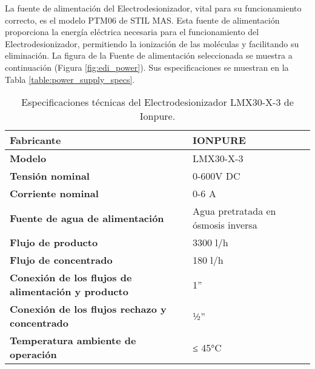 

La fuente de alimentación del Electrodesionizador, vital para su funcionamiento correcto, es el modelo PTM06 de STIL MAS. Esta fuente de alimentación proporciona la energía eléctrica necesaria para el funcionamiento del Electrodesionizador, permitiendo la ionización de las moléculas y facilitando su eliminación. La figura de la Fuente de alimentación seleccionada se muestra a continuación (Figura \ref{fig:edi_power}). Sus especificaciones se muestran en la Tabla \ref{table:power_supply_specs}.




\begin{table}[H]
    \centering
    \caption{Especificaciones técnicas del Electrodesionizador LMX30-X-3 de Ionpure.}
    \label{table:edi_specs}
    \begin{tabular}{| L{6cm} | L{6cm} |}
        \hline
        \textbf{Fabricante}                                        & IONPURE                            \\
        \hline
        \textbf{Modelo}                                            & LMX30-X-3                          \\
        \hline
        \textbf{Tensión nominal}                                   & 0-600V DC                          \\
        \hline
        \textbf{Corriente nominal}                                 & 0-6 A                              \\
        \hline
        \textbf{Fuente de agua de alimentación}                    & Agua pretratada en ósmosis inversa \\
        \hline
        \textbf{Flujo de producto}                                 & 3300 l/h                           \\
        \hline
        \textbf{Flujo de concentrado}                              & 180 l/h                            \\
        \hline
        \textbf{Conexión de los flujos de alimentación y producto} & 1”                                 \\
        \hline
        \textbf{Conexión de los flujos rechazo y concentrado}      & ½”                                 \\
        \hline
        \textbf{Temperatura ambiente de operación}                 & ≤ 45°C                             \\
        \hline
    \end{tabular}
\end{table}

